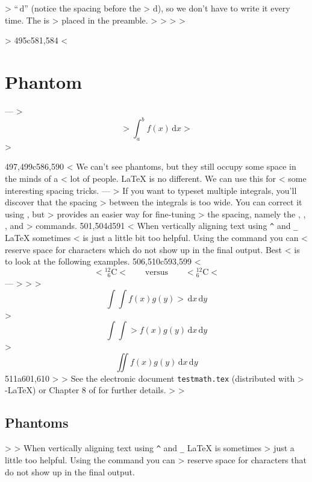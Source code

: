 \begin{example}
> ``$\,\mathrm{d}$'' (notice the spacing \demowidth{0.166em} before the
> $\text{d}$), so we don't have to write it every time. The  is
> placed in the preamble. %
> %
> %
> %
> \begin{example}
> \newcommand{\ud}{\,\mathrm{d}}
495c581,584
< \section{Phantom}
---
> \begin{equation*}
>  \int_a^b f(x)\ud x 
> \end{equation*}
> \end{example}
497,499c586,590
< We can't see phantoms, but they still occupy some space in the minds of a
< lot of people. \LaTeX{} is no different. We can use this for
< some interesting spacing tricks.
---
> If you want to typeset multiple integrals, you'll discover that the spacing
> between the integrals is too wide. You can correct it using \ci{!}, but
>  provides an easier way for fine-tuning
> the spacing, namely the , , , and 
> commands.
501,504d591
< When vertically aligning text using \verb|^| and \verb|_| \LaTeX{} sometimes
< is just a little bit too helpful. Using the  command you can
< reserve space for characters which do not show up in the final output. Best
< is to look at the following examples.
506,510c593,599
< \begin{displaymath}
< {}^{12}_{\phantom{1}6}\textrm{C}
< \qquad \textrm{versus} \qquad
< {}^{12}_{6}\textrm{C}
< \end{displaymath}
---
> \newcommand{\ud}{\,\mathrm{d}}
> 
> \[ \int\int f(x)g(y) 
>                   \ud x \ud y \]
> \[ \int\!\!\!\int 
>          f(x)g(y) \ud x \ud y \]
> \[ \iint f(x)g(y) \ud x \ud y \]
511a601,610
> 
> See the electronic document \texttt{testmath.tex} (distributed with
> \AmS-\LaTeX) or Chapter 8 of \companion{} for further details.
> 
> \subsection{Phantoms}
> 
> When vertically aligning text using \verb|^| and \verb|_| \LaTeX{} is sometimes
> just a little too helpful. Using the  command you can
> reserve space for characters that do not show up in the final output.

\end{example}
